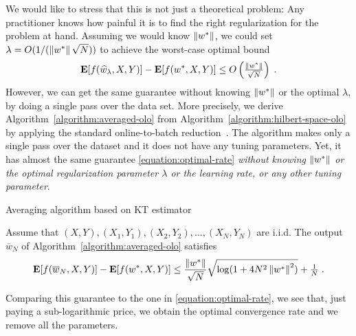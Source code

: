 We would like to
stress that this is not just a theoretical problem: Any practitioner knows how
painful it is to find the right regularization for the problem at hand.
Assuming we would know $\left\|{w^*}\right\|$, we could set $\lambda = O(1/(\left\|{w^*}\right\|
\sqrt{N}))$ to achieve the worst-case optimal bound
%
\begin{equation}
\label{equation:optimal-rate}
\operatorname*{\mathbf{E}}[f(\widehat{w}_\lambda,X,Y)] - \operatorname*{\mathbf{E}}[f(w^*,X,Y)] \le O\left(\tfrac{\left\|{w^*}\right\|}{\sqrt{N}}\right) \; .
\end{equation}
However, we can get the same guarantee without knowing $\left\|{w^*}\right\|$ or the optimal $\lambda$,
by doing a single pass over the data set. More precisely, we derive
Algorithm~\ref{algorithm:averaged-olo} from
Algorithm~\ref{algorithm:hilbert-space-olo} by applying the standard
online-to-batch reduction~\citep{Shalev-Shwartz-2011}.  The algorithm makes
only a single pass over the dataset and it does not have any tuning parameters.
Yet, it has almost the same guarantee \eqref{equation:optimal-rate}
\emph{without knowing $\left\|{w^*}\right\|$ or the optimal regularization parameter
$\lambda$ or the learning rate, or any other tuning parameter}.

\begin{algorithm}[t]
\caption{Averaging algorithm based on KT estimator \label{algorithm:averaged-olo}}
\begin{algorithmic}[1]
{
\ENDFOR
{}
}
\end{algorithmic}
\end{algorithm}
%
\begin{theorem}
Assume that $(X, Y), (X_1, Y_1), (X_2, Y_2), \dots, (X_N,Y_N)$ are i.i.d.  The
output $\overline{w}_N$ of Algorithm~\ref{algorithm:averaged-olo} satisfies
$$
\operatorname*{\mathbf{E}}[f(\overline{w}_N,X,Y)] - \operatorname*{\mathbf{E}}[f(w^*,X,Y)] \le \frac{\left\|{w^*}\right\|}{\sqrt{N}} \sqrt{\log(1+4 N^2 \left\|{w^*}\right\|^2)} + \tfrac{1}{N} \; .
$$
\end{theorem}
%
Comparing this guarantee to the one in \eqref{equation:optimal-rate}, we see
that, just paying a sub-logarithmic price, we obtain the optimal convergence
rate and we remove all the parameters.
